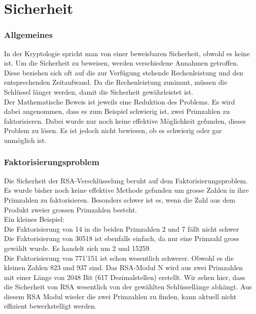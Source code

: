 \part{Sicherheit}
\section{Allgemeines}
In der Kryptologie spricht man von einer beweisbaren Sicherheit, obwohl es keine ist. Um die Sicherheit zu beweisen, werden verschiedene Annahmen getroffen. Diese beziehen sich oft auf die zur Verfügung stehende Rechenleistung und den entsprechenden Zeitaufwand. Da die Rechenleistung zunimmt, müssen die Schlüssel länger werden, damit die Sicherheit gewährleistet ist. \\
Der Mathematische Beweis ist jeweils eine Reduktion des Problems. Es wird dabei angenommen, dass es  zum Beispiel schwierig ist, zwei Primzahlen zu faktorisieren. Dabei wurde nur noch keine effektive Möglichkeit gefunden, dieses Problem zu lösen. Es ist jedoch nicht bewiesen, ob es schwierig oder gar unmöglich ist.
%
\section{Faktorisierungsproblem}
Die Sicherheit der RSA-Verschlüsselung beruht auf dem Faktorisierungsproblem. Es wurde bisher noch keine effektive Methode gefunden um grosse Zahlen in ihre Primzahlen zu faktorisieren. Besonders schwer ist es, wenn die Zahl aus dem Produkt zweier grossen Primzahlen besteht. \\
Ein kleines Beispiel:\\
Die Faktorisierung von 14 in die beiden Primzahlen 2 und 7 fällt nicht schwer\\
Die Faktorisierung von 30518 ist ebenfalls einfach, da nur eine Primzahl gross gewählt wurde. Es handelt sich um 2 und 15259. \\
Die Faktorisierung von 771'151 ist schon wesentlich schwerer. Obwohl es die kleinen Zahlen 823 und 937 sind. Das RSA-Modul N wird aus zwei Primzahlen mit einer Länge von 2048 Bit (617 Dezimalstellen) erstellt. Wir sehen hier, dass die Sicherheit von RSA wesentlich von der gewählten Schlüssellänge abhängt. Aus diesem RSA Modul wieder die zwei Primzahlen zu finden, kann aktuell nicht effizient bewerkstelligt werden.
%
